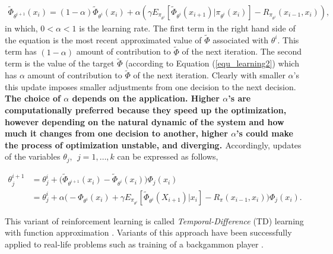 \documentclass[12pt]{aastex62}
\theoremstyle{definition}
\begin{document}
\begin{equation}\label{equ_updatePHI}
\begin{aligned}
\tilde \Phi_{\theta^{i+1}}(x_{{i}}) = (1-\alpha) \tilde \Phi_{\theta^{i}}(x_{{i}})+ \alpha  ( \gamma  E_{\pi_{\theta^i}}[\tilde \Phi_{\theta^{i}}(x_{{i+1}})|\pi_{\theta^{i}}(x_{{i}})] -R_{\pi_{\theta^i}}(x_{i-1},x_i) ),
\end{aligned}
\end{equation}
in which, $0<\alpha<1$ is the learning rate. The first term in the right hand side of the equation is the most recent approximated value of $\tilde \Phi$ associated with $\theta^i$. This term has $(1-\alpha)$ amount of contribution to $\tilde \Phi$ of the next iteration. The second term is the value of the target $\tilde \Phi$ (according to Equation (\ref{equ_learning2}) which has $\alpha$ amount of contribution to $\tilde \Phi$ of the next iteration. Clearly with smaller $\alpha$'s this update imposes smaller adjustments from one decision to the next decision. {\bf The choice of $\alpha$ depends on the application. Higher $\alpha$'s are computationally preferred because they speed up the optimization, however depending on the natural dynamic of the system and how much it changes from one decision to another, higher $\alpha$'s could make the process of optimization unstable, and diverging. \bf} Accordingly, updates of the variables $\theta_j,~~j=1,\dots, k$ can be expressed as follows, 

\begin{equation} \label{equ_TD_update}
\begin{aligned}
\theta_j^{i+1} &= \theta_j^{i} + \Big( \tilde \Phi_{\theta^{i+1}}(x_{{i}})  - \tilde \Phi_{\theta^{i}}(x_{{i}}) \Big)\Phi_j(x_{i})\\
& = \theta_j^{i} + \alpha \Big(-\Phi_{\theta^{i}}(x_{{i}}) + \gamma  E_{\pi_{\theta^i}}[\tilde \Phi_{\theta^{i}}(X_{{i+1}})|x_{{i}}] -R_{\pi}(x_{i-1},x_i)  \Big)\Phi_j(x_{i}).
\end{aligned}
\end{equation}

This variant of reinforcement learning is called \textit{Temporal-Difference} (TD) learning with function approximation \citep{tsitsiklis1997analysis}. Variants of this approach have been successfully applied to real-life problems such as training of a backgammon player \citep{tesauro1995temporal}.
\end{document}
